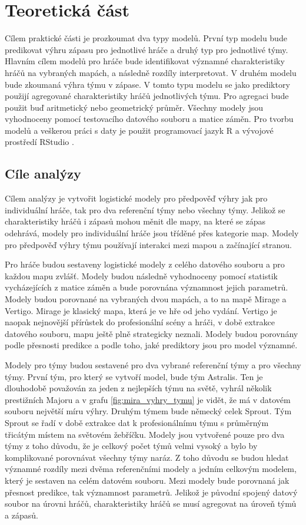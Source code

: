 \chapter{Teoretická část}
Cílem praktické části je prozkoumat dva typy modelů. První typ modelu bude predikovat výhru zápasu pro jednotlivé hráče a druhý typ pro jednotlivé týmy. Hlavním cílem 
modelů pro hráče bude identifikovat významné charakteristiky hráčů na vybraných mapách, a následně rozdíly interpretovat. V druhém modelu bude zkoumaná výhra týmu v zápase.
V tomto typu modelu se jako prediktory použijí agregované charakteristiky hráčů jednotlivých týmu. Pro agregaci bude použit buď aritmetický nebo geometrický průměr. Všechny
modely jsou vyhodnoceny pomocí testovacího datového souboru a matice záměn. Pro tvorbu modelů a veškerou práci s daty je použit programovací jazyk R \cite{r_core_team_r_2022}
a vývojové prostředí RStudio \cite{rstudio_rstudio_2022}.

\section{Cíle analýzy}
Cílem analýzy je vytvořit logistické modely pro předpověď výhry jak pro individuální hráče, tak pro dva referenční týmy nebo všechny týmy. Jelikož se charakteristiky hráčů i zápasů mohou měnit dle mapy,
na které se zápas odehrává, modely pro individuální hráče jsou tříděné přes kategorie map. Modely pro předpověď výhry týmu používají interakci mezi mapou a začínající
stranou.

Pro hráče budou sestaveny logistické modely z celého datového souboru a pro každou mapu zvlášť. Modely budou následně vyhodnoceny pomocí statistik vycházejících
z matice záměn a bude porovnána významnost jejich parametrů. Modely budou porovnané na vybraných dvou mapách, a to na mapě Mirage a Vertigo. Mirage je klasický mapa, která je
ve hře od jeho vydání. Vertigo je naopak nejnovější přírůstek do profesionální scény a hráči, v době extrakce datového souboru, mapu ještě plně strategicky 
neznali. Modely budou porovnány podle přesnosti predikce a podle toho, jaké prediktory jsou pro model významné.

Modely pro týmy budou sestavené pro dva vybrané referenční týmy a pro všechny týmy. První tým, pro který se vytvoří model, bude tým Astralis.
Ten je dlouhodobě považován za jeden z nejlepších týmu na světě, vyhrál několik prestižních Majoru a v grafu \ref{fig:mira_vyhry_tymu} je vidět, že má v datovém souboru největší míru výhry. Druhým týmem bude 
německý celek Sprout. Tým Sprout se řadí v době extrakce dat k profesionálnímu týmu s průměrným třicátým místem na světovém žebříčku. Modely jsou vytvořené pouze pro dva týmy z toho
důvodu, že je celkový počet týmů velmi vysoký a bylo by komplikované porovnávat všechny týmy naráz. Z toho důvodu se budou hledat významné rozdíly mezi dvěma referenčními modely a
jedním celkovým modelem, který je sestaven na celém datovém souboru. Mezi modely bude porovnaná jak přesnost predikce, tak významnost parametrů. Jelikož je původní spojený datový
soubor na úrovni hráčů, charakteristiky hráčů se musí agregovat na úroveň týmů a zápasů.


